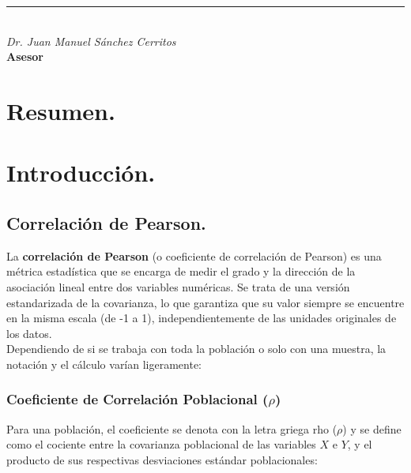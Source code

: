 \documentclass[12pt]{article}
\begin{document}
\begin{center}
\vspace{1.5cm}

\begin{center}
\begin{minipage}{0.35\textwidth}
    \centering
    \rule{\textwidth}{0.4pt}\\
    \emph{Dr. Juan Manuel Sánchez Cerritos}\\
    \textbf{Asesor}
\end{minipage}
\end{center}

\end{center}
\newpage

\tableofcontents 

\newpage

\section*{Resumen.}


\section*{Introducción.}

\subsection*{Correlación de Pearson.}

La \textbf{correlación de Pearson} (o coeficiente de correlación de Pearson) es una métrica estadística que se encarga de medir el grado y la dirección de la asociación lineal entre dos variables numéricas. Se trata de una versión estandarizada de la covarianza, lo que garantiza que su valor siempre se encuentre en la misma escala (de -1 a 1), independientemente de las unidades originales de los datos.\cite{ref2}\\

Dependiendo de si se trabaja con toda la población o solo con una muestra, la notación y el cálculo varían ligeramente:

\subsubsection*{Coeficiente de Correlación Poblacional ($\rho$)}

Para una población, el coeficiente se denota con la letra griega rho ($\rho$) y se define como el cociente entre la covarianza poblacional de las variables $X$ e $Y$, y el producto de sus respectivas desviaciones estándar poblacionales\cite{ref1}:
\end{document}
